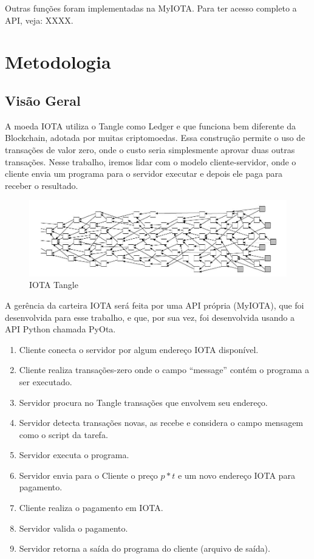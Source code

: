 \documentclass[a4paper]{article}
\begin{document}
Outras funções foram implementadas na MyIOTA. Para ter acesso completo a API, veja: XXXX.

\section{Metodologia}\label{sec:Metodology}

\subsection{Visão Geral}

A moeda IOTA utiliza o Tangle como Ledger e que funciona bem diferente da Blockchain, adotada por muitas criptomoedas. Essa construção
permite o uso de transações de valor zero, onde o custo seria simplesmente aprovar duas outras transações. Nesse trabalho, iremos
lidar com o modelo cliente-servidor, onde o cliente envia um programa para o servidor executar e depois ele paga para receber
o resultado.

\begin{figure}[!htb]
\centering
\includegraphics[scale=0.4]{tangle.jpg}
\caption{IOTA Tangle}
\label{fig:tangle}
\end{figure}

A gerência da carteira IOTA será feita por uma API própria (MyIOTA), que foi desenvolvida para esse trabalho, e que, por sua vez, foi
desenvolvida usando a API Python chamada PyOta.

\begin{enumerate}
\item Cliente conecta o servidor por algum endereço IOTA disponível.
\item Cliente realiza transações-zero onde o campo ``message'' contém o programa a ser executado.
\item Servidor procura no Tangle transações que envolvem seu endereço.
\item Servidor detecta transações novas, as recebe e considera o campo mensagem como o script da tarefa.
\item Servidor executa o programa.
\item Servidor envia para o Cliente o preço $p*t$ e um novo endereço IOTA para pagamento.
\item Cliente realiza o pagamento em IOTA.
\item Servidor valida o pagamento.
\item Servidor retorna a saída do programa do cliente (arquivo de saída).
\end{enumerate}
\end{document}
